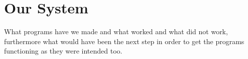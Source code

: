 \section{Our System}

What programs have we made and what worked and what did not work, furthermore what would have been the next step in order to get the programs functioning as they were intended too.

